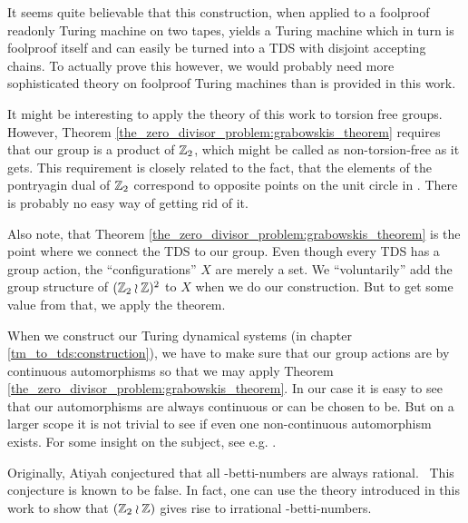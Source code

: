 \begin{Remark}
	It seems quite believable that this construction, when applied to a foolproof readonly Turing machine on two tapes, yields a Turing machine which in turn is foolproof itself and can easily be turned into a TDS with disjoint accepting chains.
	To actually prove this however, we would probably need more sophisticated theory on foolproof Turing machines than is provided in this work.
\end{Remark}

\begin{Remark}
	\label{remarks:torsion_free_groups}
	It might be interesting to apply the theory of this work to torsion free groups.
	However, Theorem \ref{the_zero_divisor_problem:grabowskis_theorem} requires that our group is a product of $\mathbb{Z}_2$, which might be called as non-torsion-free as it gets.
	This requirement is closely related to the fact, that the elements of the pontryagin dual of $\mathbb{Z}_2$ correspond to opposite points on the unit circle in \C.
	There is probably no easy way of getting rid of it.

	Also note, that Theorem \ref{the_zero_divisor_problem:grabowskis_theorem} is the point where we connect the TDS to our group.
	Even though every TDS has a group action, the ``configurations'' $X$ are merely a set.
	We ``voluntarily'' add the group structure of $(\mathbb{Z}_2 \wr \mathbb{Z})^2$ to $X$ when we do our construction.
	But to get some value from that, we apply the theorem.
\end{Remark}

\begin{Remark}
	\label{remarks:continuous_group_automorphisms}
	When we construct our Turing dynamical systems (in chapter \ref{tm_to_tds:construction}), we have to make sure that our group actions are by continuous automorphisms so that we may apply Theorem \ref{the_zero_divisor_problem:grabowskis_theorem}.
	In our case it is easy to see that our automorphisms are always continuous or can be chosen to be.
	But on a larger scope it is not trivial to see if even one non-continuous automorphism exists. For some insight on the subject, see e.g. \cite{bhk16}.
\end{Remark}

\begin{Remark}
	\label{remarks:atiyah-conjecture}
	Originally, Atiyah conjectured that all \ltwo-betti-numbers are always rational.\footnotemark~
	This conjecture is known to be false.
	In fact, one can use the theory introduced in this work to show that $(\mathbb{Z}_2 \wr \mathbb{Z})$ gives rise to irrational \ltwo-betti-numbers.
\end{Remark}
